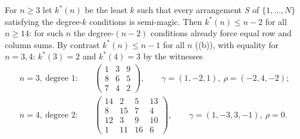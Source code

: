 \begin{theorem}
\label{thm:perm_threshold}
For $n\ge3$ let $k^{*}(n)$ be the least $k$ such that every arrangement $S$ of $\{1,\dots,N\}$ satisfying
the degree-$k$ conditions is semi-magic.  Then $k^{*}(n)\le n-2$ for all $n\ge14$: for such $n$ the degree-$(n-2)$
conditions already force equal row and column sums.
By contrast $k^{*}(n)\le n-1$ for all $n$ ((b)), with equality for $n=3,4$: $k^{*}(3)=2$ and $k^{*}(4)=3$
by the witnesses
\begin{align*}
n=3,\ \text{degree }1:&\quad
\begin{pmatrix}1&3&9\\8&6&5\\7&4&2\end{pmatrix},\qquad \gamma=(1,-2,1),\ \rho=(-2,4,-2);\\[2pt]
n=4,\ \text{degree }2:&\quad
\begin{pmatrix}14&2&5&13\\8&15&7&4\\12&3&9&10\\1&11&16&6\end{pmatrix},\qquad \gamma=(1,-3,3,-1),\ \rho=0.
\end{align*}
\end{theorem}

